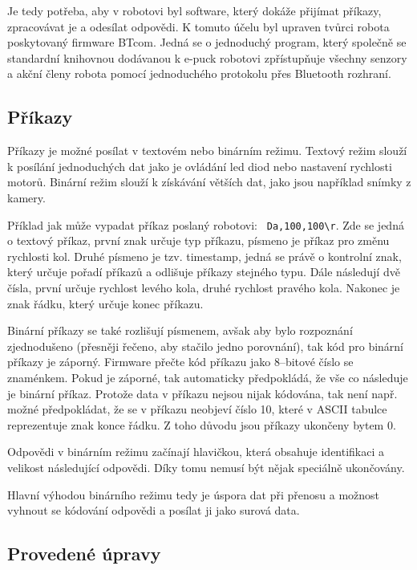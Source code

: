 \documentclass[12pt,notitlepage]{report}
\begin{document}
    Je tedy potřeba, aby v robotovi byl software, který dokáže přijímat
    příkazy, zpracovávat je a odesílat odpovědi. K tomuto účelu byl upraven
    tvůrci robota poskytovaný firmware BTcom. Jedná se o jednoduchý program,
    který společně se standardní knihovnou dodávanou k e-puck robotovi
    zpřístupňuje všechny senzory a akční členy robota pomocí jednoduchého
    protokolu přes Bluetooth rozhraní.

    \subsection{Příkazy}
    \label{btcom:prikazy}

    Příkazy je možné posílat v textovém nebo binárním režimu. Textový režim
    slouží k posílání jednoduchých dat jako je ovládání led diod nebo nastavení
    rychlosti motorů. Binární režim slouží k získávání větších dat, jako jsou
    například snímky z kamery.

    Příklad jak může vypadat příkaz poslaný robotovi: {\tt
    Da,100,100\textbackslash r}. Zde se jedná o textový příkaz, první znak
    určuje typ příkazu, písmeno  je příkaz pro změnu rychlosti kol. Druhé
    písmeno je tzv. timestamp, jedná se právě o kontrolní znak, který určuje
    pořadí příkazů a odlišuje příkazy stejného typu. Dále následují dvě čísla,
    první určuje rychlost levého kola, druhé rychlost pravého kola. Nakonec je
    znak řádku, který určuje konec příkazu.

    Binární příkazy se také rozlišují písmenem, avšak aby bylo rozpoznání
    zjednodušeno (přesněji řečeno, aby stačilo jedno porovnání), tak kód pro
    binární příkazy je záporný. Firmware přečte kód příkazu jako 8--bitové
    číslo se znaménkem. Pokud je záporné, tak automaticky předpokládá, že vše
    co následuje je binární příkaz. Protože data v příkazu nejsou nijak
    kódována, tak není např. možné předpokládat, že se v příkazu neobjeví číslo
    10, které v ASCII tabulce reprezentuje znak konce řádku. Z toho důvodu jsou
    příkazy ukončeny bytem 0.

    Odpovědi v binárním režimu začínají hlavičkou, která obsahuje identifikaci
    a velikost následující odpovědi. Díky tomu nemusí být nějak speciálně
    ukončovány.

    Hlavní výhodou binárního režimu tedy je úspora dat při přenosu a možnost
    vyhnout se kódování odpovědi a posílat ji jako surová data.

    \subsection{Provedené úpravy}
    \label{btcom:upravy}
\end{document}
